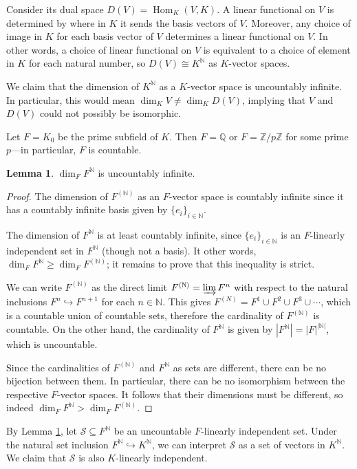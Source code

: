 \documentclass[12pt]{article}
\theoremstyle{definition}
\newtheorem{lemma}{Lemma}
\newcommand{\N}{\mathbb{N}}
\newcommand{\Z}{\mathbb{Z}}
\newcommand{\Q}{\mathbb{Q}}
\newcommand{\<}{\langle}
\renewcommand{\>}{\rangle}
\newcommand{\iso}{\cong}
\newcommand{\seq}{\subseteq}
\newcommand{\inc}{\hookrightarrow}
\renewcommand{\_}[1]{{_{#1}}}
\DeclareMathOperator{\Hom}{Hom}
\begin{document}
Consider its dual space $D(V) = \Hom_K(V, K)$.
A linear functional on $V$ is determined by where in $K$ it sends the basis vectors of $V$.
Moreover, any choice of image in $K$ for each basis vector of $V$ determines a linear functional on $V$.
In other words, a choice of linear functional on $V$ is equivalent to a choice of element in $K$ for each natural number, so $D(V) \iso K^\N$ as $K$-vector spaces.

We claim that the dimension of $K^\N$ as a $K$-vector space is uncountably infinite.
In particular, this would mean $\dim_K V \ne \dim_K D(V)$, implying that $V$ and $D(V)$ could not possibly be isomorphic.

Let $F = K_0$ be the prime subfield of $K$.
Then $F = \Q$ or $F = \Z/p\Z$ for some prime $p$---in particular, $F$ is countable.

\begin{lemma}\label{lem:dimF^N}
    $\dim_F F^\N$ is uncountably infinite.
\end{lemma}

\begin{proof}
    The dimension of $F^{(\N)}$ as an $F$-vector space is countably infinite since it has a countably infinite basis given by $\{e_i\}_{i \in \N}$.

    The dimension of $F^\N$ is at least countably infinite, since $\{e_i\}_{i \in \N}$ is an $F$-linearly independent set in $F^\N$ (though not a basis).
    It other words, $\dim_F F^\N \geq \dim_F F^{(\N)}$; it remains to prove that this inequality is strict.

    We can write $F^{(\N)}$ as the direct limit $F^{(\N)} = \varinjlim F^n$ with respect to the natural inclusions $F^n \inc F^{n+1}$ for each $n \in \N$.
    This gives $F^{(N)} = F^1 \cup F^2 \cup F^3 \cup \cdots$, which is a countable union of countable sets, therefore the cardinality of $F^{(\N)}$ is countable.
    On the other hand, the cardinality of $F^\N$ is given by $|F^\N| = |F|^{|\N|}$, which is uncountable.

    Since the cardinalities of $F^{(\N)}$ and $F^\N$ as sets are different, there can be no bijection between them.
    In particular, there can be no isomorphism between the respective $F$-vector spaces.
    It follows that their dimensions must be different, so indeed $\dim_F F^\N > \dim_F F^{(\N)}$.
\end{proof}

By Lemma \ref{lem:dimF^N}, let $\mathcal{S} \seq F^\N$ be an uncountable $F$-linearly independent set.
Under the natural set inclusion $F^\N \inc K^\N$, we can interpret $\mathcal{S}$ as a set of vectors in $K^\N$.
We claim that $\mathcal{S}$ is also $K$-linearly independent.
\end{document}
